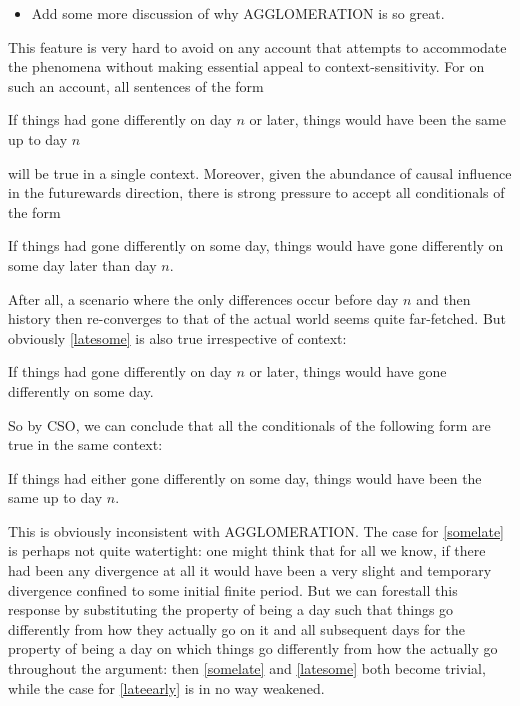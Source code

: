 \documentclass[If.tex]{subfiles}
\begin{document}
\begin{itemize} 
	\item
	Add some more discussion of why AGGLOMERATION is so great. 
\end{itemize}

This feature is very hard to avoid on any account that attempts to accommodate the phenomena without making essential appeal to context-sensitivity. For on such an account, all sentences of the form
\begin{prop}
	\nitem \label{lateearly}
		If things had gone differently on day $n$ or later, things would have been the same up to day $n$
\end{prop}
will be true in a single context. Moreover, given the abundance of causal influence in the futurewards direction, there is strong pressure to accept all conditionals of the form
\begin{prop}
	\nitem \label{somelate}
		If things had gone differently on some day, things would have gone differently on some day later than day $n$.
\end{prop}
After all, a scenario where the only differences occur before day $n$ and then history then re-converges to that of the actual world seems quite far-fetched. But obviously \ref{latesome} is also true irrespective of context:
\begin{prop}
	\nitem \label{latesome}
		If things had gone differently on day $n$ or later, things would have gone differently on some day.
\end{prop}
So by CSO, we can conclude that all the conditionals of the following form are true in the same context:
\begin{prop}
	\nitem \label{someearly}
		If things had either gone differently on some day, things would have been the same up to day $n$.
\end{prop}
This is obviously inconsistent with AGGLOMERATION. The case for \ref{somelate} is perhaps not quite watertight: one might think that for all we know, if there had been any divergence at all it would have been a very slight and temporary divergence confined to some initial finite period. But we can forestall this response by substituting the property of being a day such that things go differently from how they actually go on it and all subsequent days for the property of being a day on which things go differently from how the actually go throughout the argument: then \ref{somelate} and \ref{latesome} both become trivial, while the case for \ref{lateearly} is in no way weakened.
\end{document}
